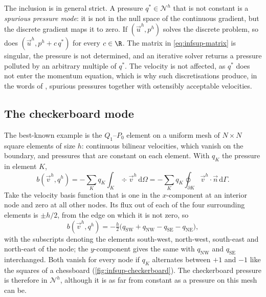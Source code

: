 The inclusion is in general strict. A pressure $q^\ast \in \mathcal{N}^h$ that is not constant is a \emph{spurious pressure mode}: it is not in the null space of the continuous gradient, but the discrete gradient maps it to zero. If $(\vec{u}^h, p^h)$ solves the discrete problem, so does $(\vec{u}^h, p^h + c\, q^\ast)$ for every $c \in \R$. The matrix in \cref{eq:infsup-matrix} is singular, the pressure is not determined, and an iterative solver returns a pressure polluted by an arbitrary multiple of $q^\ast$. The velocity is not affected, as $q^\ast$ does not enter the momentum equation, which is why such discretisations produce, in the words of \textcite{Sani1981}, spurious pressures together with ostensibly acceptable velocities.

\subsection{The checkerboard mode}\label{sec:infsup-checkerboard}

The best-known example is the $Q_1$--$P_0$ element on a uniform mesh of $N \times N$ square elements of size $h$: continuous bilinear velocities, which vanish on the boundary, and pressures that are constant on each element. With $q_K$ the pressure in element $K$,
\begin{equation*}
    b(\vec{v}^h, q^h) = -\sum_K q_K \int_K \div\vec{v}^h \,\mathrm{d}\Omega
                      = -\sum_K q_K \oint_{\partial K} \vec{v}^h \cdot \vec{n} \,\mathrm{d}\Gamma .
\end{equation*}
Take the velocity basis function that is one in the $x$-component at an interior node and zero at all other nodes. Its flux out of each of the four surrounding elements is $\pm h/2$, from the edge on which it is not zero, so
\begin{equation*}
    b(\vec{v}^h, q^h) = -\tfrac{h}{2} \bigl( q_\mathrm{SW} + q_\mathrm{NW} - q_\mathrm{SE} - q_\mathrm{NE} \bigr) ,
\end{equation*}
with the subscripts denoting the elements south-west, north-west, south-east and north-east of the node; the $y$-component gives the same with $q_\mathrm{NW}$ and $q_\mathrm{SE}$ interchanged. Both vanish for every node if $q_K$ alternates between $+1$ and $-1$ like the squares of a chessboard (\cref{fig:infsup-checkerboard}). The checkerboard pressure is therefore in $\mathcal{N}^h$, although it is as far from constant as a pressure on this mesh can be.

